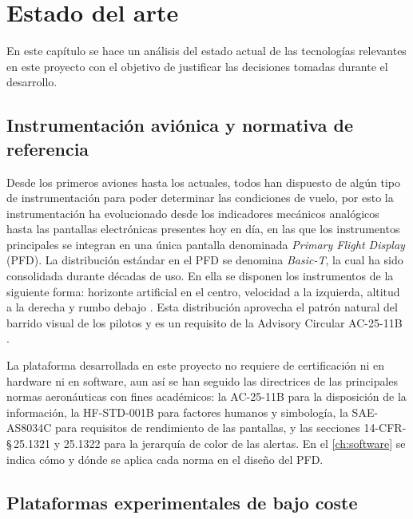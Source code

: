 
\chapter{Estado del arte}
\label{ch:estado_del_arte}

En este capítulo se hace un análisis del estado actual de las tecnologías relevantes en este proyecto con el objetivo de justificar las decisiones tomadas durante el desarrollo.


\section{Instrumentación aviónica y normativa de referencia}
\label{sec:ea_avionica}

Desde los primeros aviones hasta los actuales, todos han dispuesto de algún tipo de instrumentación para poder determinar las condiciones de vuelo, por esto la instrumentación ha evolucionado desde los indicadores mecánicos analógicos hasta las pantallas electrónicas presentes hoy en día, en las que los instrumentos principales se integran en una única pantalla denominada \textit{Primary Flight Display} (PFD). La distribución estándar en el PFD se denomina \textit{Basic-T}, la cual ha sido consolidada durante décadas de uso. En ella se disponen los instrumentos de la siguiente forma: horizonte artificial en el centro, velocidad a la izquierda, altitud a la derecha y rumbo debajo \cite{faa_phak, collinson2011}. Esta distribución aprovecha el patrón natural del barrido visual de los pilotos y es un requisito de la Advisory Circular AC-25-11B \cite{ac25_11b}.

La plataforma desarrollada en este proyecto no requiere de certificación ni en hardware ni en software, aun así se han seguido las directrices de las principales normas aeronáuticas con fines académicos: la AC-25-11B \cite{ac25_11b} para la
disposición de la información, la HF-STD-001B \cite{hfstd001b} para factores humanos y simbología, la SAE-AS8034C \cite{sae_as8034c} para requisitos de rendimiento de las pantallas, y las secciones 14-CFR-\S\,25.1321 y 25.1322 \cite{cfr25_1321, cfr25_1322} para la jerarquía de color de las alertas. En el \cref{ch:software} se indica cómo y dónde se aplica cada norma en el diseño del PFD.

\newpage
\section{Plataformas experimentales de bajo coste}
\label{sec:ea_plataformas}

